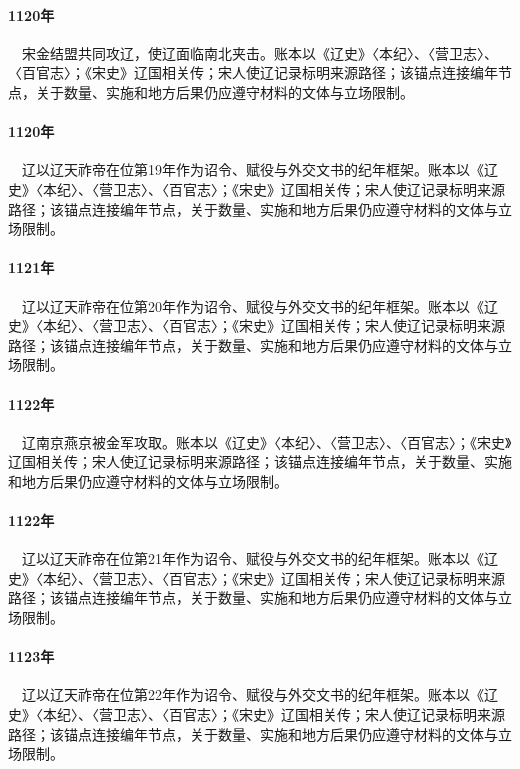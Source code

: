 \paragraph{1120年}　宋金结盟共同攻辽，使辽面临南北夹击。账本以《辽史》〈本纪〉、〈营卫志〉、〈百官志〉；《宋史》辽国相关传；宋人使辽记录标明来源路径；该锚点连接编年节点，关于数量、实施和地方后果仍应遵守材料的文体与立场限制。

\paragraph{1120年}　辽以辽天祚帝在位第19年作为诏令、赋役与外交文书的纪年框架。账本以《辽史》〈本纪〉、〈营卫志〉、〈百官志〉；《宋史》辽国相关传；宋人使辽记录标明来源路径；该锚点连接编年节点，关于数量、实施和地方后果仍应遵守材料的文体与立场限制。

\paragraph{1121年}　辽以辽天祚帝在位第20年作为诏令、赋役与外交文书的纪年框架。账本以《辽史》〈本纪〉、〈营卫志〉、〈百官志〉；《宋史》辽国相关传；宋人使辽记录标明来源路径；该锚点连接编年节点，关于数量、实施和地方后果仍应遵守材料的文体与立场限制。

\paragraph{1122年}　辽南京燕京被金军攻取。账本以《辽史》〈本纪〉、〈营卫志〉、〈百官志〉；《宋史》辽国相关传；宋人使辽记录标明来源路径；该锚点连接编年节点，关于数量、实施和地方后果仍应遵守材料的文体与立场限制。

\paragraph{1122年}　辽以辽天祚帝在位第21年作为诏令、赋役与外交文书的纪年框架。账本以《辽史》〈本纪〉、〈营卫志〉、〈百官志〉；《宋史》辽国相关传；宋人使辽记录标明来源路径；该锚点连接编年节点，关于数量、实施和地方后果仍应遵守材料的文体与立场限制。

\paragraph{1123年}　辽以辽天祚帝在位第22年作为诏令、赋役与外交文书的纪年框架。账本以《辽史》〈本纪〉、〈营卫志〉、〈百官志〉；《宋史》辽国相关传；宋人使辽记录标明来源路径；该锚点连接编年节点，关于数量、实施和地方后果仍应遵守材料的文体与立场限制。

